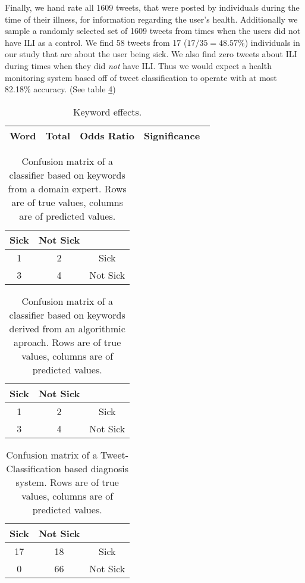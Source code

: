 \documentclass{acm_proc_article-sp}
\begin{document}
Finally, we hand rate all 1609 tweets, that were posted by individuals during the time of their illness,  for information regarding the user's health. Additionally we sample a randomly selected set of 1609 tweets from times when the users did not have ILI as a control. We find 58 tweets from 17 (\(17/35 = 48.57\%\))  individuals in our study that are about the user being sick. We also find zero tweets about ILI during times when they did \textit{not} have ILI. Thus we would expect a health monitoring system based off of tweet classification to operate with at most 82.18\% accuracy. (See table \ref{tab:tweet_classified_confusion})

%

\begin{table}
\centering
\begin{tabular}{|c|c|c|c|} \hline
Word& Total &Odds Ratio & Significance\ \\ \hline

\end{tabular}
\caption{Keyword effects.}
\label{tab:tweet_keyword_expert_results}
\end{table}

\begin{table}
\centering
\begin{tabular}{|c|c|c|} \hline
Sick&Not Sick&\ \\ \hline
1 & 2& Sick\\ \hline
3 & 4  & Not Sick\\
\hline\end{tabular}
\caption{Confusion matrix of a classifier based on keywords from a domain expert. Rows are of true values, columns are of predicted values.}
\label{tab:tweet_keyword_expert_confusion}
\end{table}

\begin{table}
\centering
\begin{tabular}{|c|c|c|} \hline
Sick&Not Sick&\ \\ \hline
1 & 2& Sick\\ \hline
3 & 4  & Not Sick\\
\hline\end{tabular}
\caption{Confusion matrix of a classifier based on keywords derived from an algorithmic aproach. Rows are of true values, columns are of predicted values.}
\label{tab:tweet_keyword_algorithm_classified_confusion}
\end{table}

\begin{table}
\centering
\begin{tabular}{|c|c|c|} \hline
Sick&Not Sick&\ \\ \hline
17 & 18 & Sick\\ \hline
0 & 66  & Not Sick\\
\hline\end{tabular}
\caption{Confusion matrix of a Tweet-Classification based diagnosis system. Rows are of true values, columns are of predicted values.}
\label{tab:tweet_classified_confusion}
\end{table}
\end{document}
